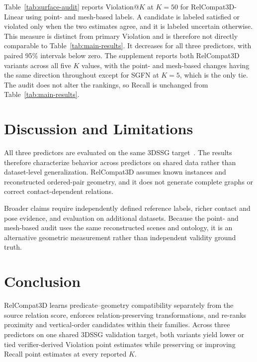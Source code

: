 Table~\ref{tab:surface-audit} reports Violation@$K$ at $K=50$ for
RelCompat3D-Linear using point- and mesh-based labels. A candidate is labeled satisfied or violated only when the two estimates agree, and it is labeled uncertain otherwise. This measure is distinct from primary Violation and is therefore not directly comparable to Table~\ref{tab:main-results}. It decreases for all three predictors, with paired 95\% intervals below zero. The supplement reports both
RelCompat3D variants across all five $K$ values, with the point- and mesh-based changes having the same direction throughout except for SGFN at $K=5$, which is the only tie. The audit does not alter the rankings, so Recall is unchanged from Table~\ref{tab:main-results}.


\section{Discussion and Limitations}

All three predictors are evaluated on the same 3DSSG target~\cite{wald2020learning}. The results therefore characterize behavior across predictors on shared data rather than dataset-level generalization. RelCompat3D assumes known instances and reconstructed ordered-pair geometry, and it does not generate complete graphs or correct contact-dependent relations.
 
Broader claims require independently defined reference labels, richer contact and pose evidence, and evaluation on additional datasets. Because the point- and mesh-based audit uses the same reconstructed scenes and ontology, it is an alternative geometric measurement rather than independent validity ground truth.


\section{Conclusion}
RelCompat3D learns predicate--geometry compatibility separately from the source relation score, enforces relation-preserving transformations, and re-ranks proximity and vertical-order candidates within their families. Across three predictors on one shared 3DSSG validation target, both variants yield lower or tied verifier-derived Violation point estimates while preserving or improving Recall point estimates at every reported $K$.